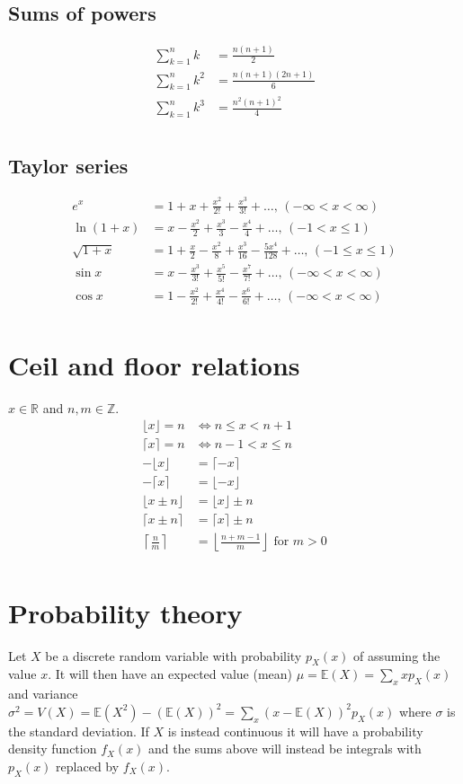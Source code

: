\subsection{Sums of powers}
\begin{align*}
\sum_{k=1}^n k &= \frac{n(n+1)}{2}\\
\sum_{k=1}^n k^2 &= \frac{n(n+1)(2n+1)}{6}\\
\sum_{k=1}^n k^3 &= \frac{n^2(n+1)^2}{4}\\
\end{align*}

\subsection{Taylor series}
\begin{align*}
e^x &= 1+x+\frac{x^2}{2!}+\frac{x^3}{3!}+\dots,\,(-\infty<x<\infty)\\
\ln(1+x) &= x-\frac{x^2}{2}+\frac{x^3}{3}-\frac{x^4}{4}+\dots,\,(-1<x\leq1)\\
\sqrt{1+x} &= 1+\frac{x}{2}-\frac{x^2}{8}+\frac{x^3}{16}-\frac{5x^4}{128}+\dots,\,(-1\leq x\leq1)\\
\sin x &= x-\frac{x^3}{3!}+\frac{x^5}{5!}-\frac{x^7}{7!}+\dots,\,(-\infty<x<\infty)\\
\cos x &= 1-\frac{x^2}{2!}+\frac{x^4}{4!}-\frac{x^6}{6!}+\dots,\,(-\infty<x<\infty)\\
\end{align*}

\section{Ceil and floor relations}
$x\in\mathbb R$ and $n,m\in\mathbb Z$.
\begin{align*}
\lfloor x \rfloor = n &\Leftrightarrow n\leq x < n+1\\
\lceil x \rceil = n &\Leftrightarrow n-1< x \leq n\\
-\lfloor x \rfloor & = \lceil -x \rceil\\
-\lceil x \rceil & = \lfloor -x \rfloor\\
\lfloor x\pm n \rfloor & = \lfloor x \rfloor\pm n\\
\lceil x\pm n \rceil & = \lceil x \rceil\pm n\\
\left\lceil \frac nm \right\rceil & = \left\lfloor \frac{n+m-1}{m} \right\rfloor \textrm{ for } m>0\\
\end{align*}

\section{Probability theory}
Let $X$ be a discrete random variable with probability $p_X(x)$ of assuming the value $x$. It will then have an expected value (mean) $\mu=\mathbb{E}(X)=\sum_xxp_X(x)$ and variance $\sigma^2=V(X)=\mathbb{E}(X^2)-(\mathbb{E}(X))^2=\sum_x(x-\mathbb{E}(X))^2p_X(x)$ where $\sigma$ is the standard deviation. If $X$ is instead continuous it will have a probability density function $f_X(x)$ and the sums above will instead be integrals with $p_X(x)$ replaced by $f_X(x)$.

